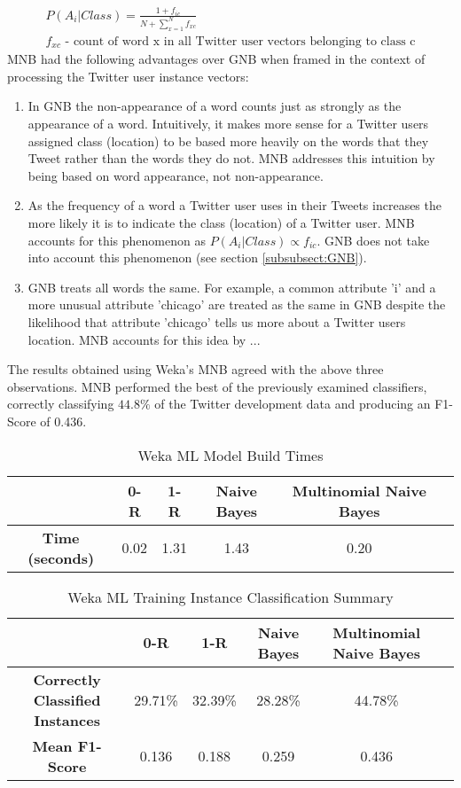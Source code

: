 \documentclass[11pt]{article}
\begin{document}
\begin{gather*}
P(A_i|Class) = \frac{1 + f_{ic}}{N + \sum_{x=1}^N f_{xc}} \tag{4}\label{eq:multi}\\ f_{xc}\text{ - count of word x in all Twitter user vectors belonging to class c}
\end{gather*}
MNB had the following advantages over GNB when framed in the context of processing the Twitter user instance vectors:
\begin{enumerate}
\item In GNB the non-appearance of a word counts just as strongly as the appearance of a word. Intuitively, it makes more sense for a Twitter users assigned class (location) to be based more heavily on the words that they Tweet rather than the words they do not. MNB addresses this intuition by being based on word appearance, not non-appearance. 
\item As the frequency of a word a Twitter user uses in their Tweets increases the more likely it is to indicate the class (location) of a Twitter user. MNB accounts for this phenomenon as $P(A_i|Class) \propto f_{ic}$. GNB does not take into account this phenomenon (see section \ref{subsubsect:GNB}).  
\item GNB treats all words the same. For example, a common attribute 'i' and a more unusual attribute 'chicago' are treated as the same in GNB despite the likelihood that attribute 'chicago' tells us more about a Twitter users location. MNB accounts for this idea by ...     
\end{enumerate}
The results obtained using Weka's MNB agreed with the above three observations. MNB performed the best of the previously examined classifiers, correctly classifying $44.8\%$ of the Twitter development data and producing an F1-Score of 0.436.

\begin{table} [ht]
\caption{Weka ML Model Build Times}
\centering
	\begin{tabular}{| c | c | c | c | c | c |}
	\hline
	 & \textbf{0-R} & \textbf{1-R} & \textbf{Naive Bayes} & \textbf{Multinomial Naive Bayes} \\
	\hline
	\textbf{Time (seconds)} & 0.02 & 1.31 & 1.43 & 0.20\\
	\hline
	\end{tabular}
\label{table:run-table}
\end{table}

\begin{table} [th]
\caption{Weka ML Training Instance Classification Summary}
\centering
	\begin{tabular}{| c | c | c | c | c | c |}
	\hline
	 & \textbf{0-R} & \textbf{1-R} & \textbf{Naive Bayes} & \textbf{Multinomial Naive Bayes} \\
	\hline
	\textbf{Correctly Classified Instances} & 29.71\% & 32.39\% & 28.28\% & 44.78\%\\
	\hline
	\textbf{Mean F1-Score} & 0.136 & 0.188 & 0.259 & 0.436\\
	\hline
	\end{tabular}
\label{table:eval-table}
\end{table}
\end{document}
